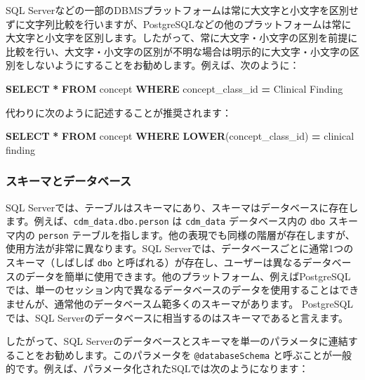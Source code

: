 \documentclass[
  11pt]{book}
\newenvironment{Shaded}{\begin{snugshade}}{\end{snugshade}}
\newcommand{\FunctionTok}[1]{\textcolor[rgb]{0.13,0.29,0.53}{\textbf{#1}}}
\newcommand{\KeywordTok}[1]{\textcolor[rgb]{0.13,0.29,0.53}{\textbf{#1}}}
\newcommand{\NormalTok}[1]{#1}
\newcommand{\OperatorTok}[1]{\textcolor[rgb]{0.81,0.36,0.00}{\textbf{#1}}}
\newcommand{\StringTok}[1]{\textcolor[rgb]{0.31,0.60,0.02}{#1}}
\theoremstyle{definition}
\theoremstyle{definition}
\theoremstyle{definition}
\theoremstyle{definition}
\theoremstyle{remark}
\begin{document}
SQL Serverなどの一部のDBMSプラットフォームは常に大文字と小文字を区別せずに文字列比較を行いますが、PostgreSQLなどの他のプラットフォームは常に大文字と小文字を区別します。したがって、常に大文字・小文字の区別を前提に比較を行い、大文字・小文字の区別が不明な場合は明示的に大文字・小文字の区別をしないようにすることをお勧めします。例えば、次のように：

\begin{Shaded}
\begin{Highlighting}[]
\KeywordTok{SELECT} \OperatorTok{*} \KeywordTok{FROM}\NormalTok{ concept }\KeywordTok{WHERE}\NormalTok{ concept\_class\_id }\OperatorTok{=} \StringTok{\textquotesingle{}Clinical Finding\textquotesingle{}}
\end{Highlighting}
\end{Shaded}

代わりに次のように記述することが推奨されます：

\begin{Shaded}
\begin{Highlighting}[]
\KeywordTok{SELECT} \OperatorTok{*} \KeywordTok{FROM}\NormalTok{ concept }\KeywordTok{WHERE} \FunctionTok{LOWER}\NormalTok{(concept\_class\_id) }\OperatorTok{=} \StringTok{\textquotesingle{}clinical finding\textquotesingle{}}
\end{Highlighting}
\end{Shaded}

\subsubsection*{スキーマとデータベース}\label{ux30b9ux30adux30fcux30deux3068ux30c7ux30fcux30bfux30d9ux30fcux30b9}

SQL Serverでは、テーブルはスキーマにあり、スキーマはデータベースに存在します。例えば、\texttt{cdm\_data.dbo.person} は \texttt{cdm\_data} データベース内の \texttt{dbo} スキーマ内の \texttt{person} テーブルを指します。他の表現でも同様の階層が存在しますが、使用方法が非常に異なります。SQL Serverでは、データベースごとに通常1つのスキーマ（しばしば \texttt{dbo} と呼ばれる）が存在し、ユーザーは異なるデータベースのデータを簡単に使用できます。他のプラットフォーム、例えばPostgreSQLでは、単一のセッション内で異なるデータベースのデータを使用することはできませんが、通常他のデータベースム範多くのスキーマがあります。 PostgreSQLでは、SQL Serverのデータベースに相当するのはスキーマであると言えます。

したがって、SQL Serverのデータベースとスキーマを単一のパラメータに連結することをお勧めします。このパラメータを \texttt{@databaseSchema} と呼ぶことが一般的です。例えば、パラメータ化されたSQLでは次のようになります：
\end{document}
